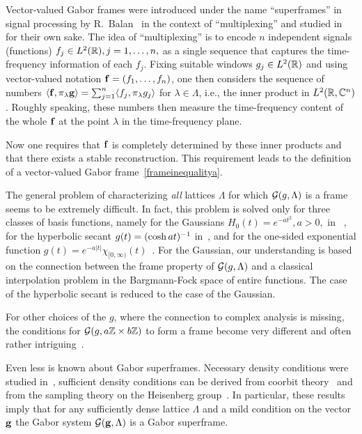 \documentclass[12pt]{amsart}
\begin{document}
Vector-valued Gabor frames were introduced under the name
``superframes'' in signal processing by 
R.~Balan~\cite{balan1} in the context of ``multiplexing'' and studied in
~\cite{balan2,han-larsen} for their own sake.  The idea of
``multiplexing'' is to encode $n$ independent signals
(functions) $f_j\in L^2(\mathbb{R} ), j=1,\dots , n,$ as a single sequence that captures the
time-frequency information of each $f_j$. Fixing suitable windows $g_j
\in L^2(\mathbb{R} )$ and using vector-valued notation $\mathbf {f} = (f_1, \dots ,
f_n)$, one then considers the sequence of numbers
 $\langle \mathbf {f} , \pi_\lambda \mathbf {g} \rangle =
  \sum _{j=1}^n \langle f_j, \pi_\lambda g_j\rangle $ 
  for $\lambda \in \Lambda $, i.e., the inner product in
$L^2(\mathbb{R} , \mathbb{C} ^n) $. Roughly speaking, these numbers then measure the
time-frequency content of the whole  $\mathbf {f}$ at the point $\lambda $ in the
time-frequency plane.

  

 Now one  requires that 
$\mathbf {f} $ is completely determined by these inner products and that
there exists a stable reconstruction. This requirement leads to the
definition of a vector-valued Gabor frame~\eqref{frameinequalitya}.  

 
The general problem of characterizing \emph{all} lattices $\Lambda $
for which $\mathcal{G} (g, \Lambda )$ is a frame seems to be extremely
difficult. In fact, this problem is solved only for three classes of
basis functions, namely for the Gaussians  $H_0(t) = e^{-at^2},
a>0,$ in ~\cite{lyu,sw}, for the hyperbolic secant $g(t) =
(\cosh a t )^{-1} $ in~\cite{JS02}, and for  the one-sided exponential function $g(t) =
e^{-a|t|} \chi _{[0,\infty )}(t)$~\cite{janssen96}.  For the Gaussian,
 our understanding is  based on the  connection between the frame property
 of $\mathcal{G} (g,\Lambda )$  and a  classical interpolation problem in the
 Bargmann-Fock  space of entire functions. The case of the hyperbolic
 secant is reduced to the case of the Gaussian. 

 For other choices of the $g$, where the connection to complex
 analysis is missing, the   conditions for $\mathcal{G}(g,a\mathbb{Z}\times b\mathbb{Z})$ to form a frame
 become very different and often rather intriguing~\cite{janssen02b}.


Even  less is known about Gabor superframes. Necessary density
conditions were studied in~\cite{balan2}, sufficient density
conditions can be derived from coorbit theory~\cite{fg89jfa} and from
the sampling theory on the Heisenberg group~\cite{fuehr07}. In particular, these
results  imply
that for any  sufficiently dense lattice $\Lambda $ and a mild condition
on the vector $\mathbf {g} $ the Gabor system $\mathcal{G} (\mathbf {g} , \Lambda )$ is a
Gabor superframe. 
\end{document}
